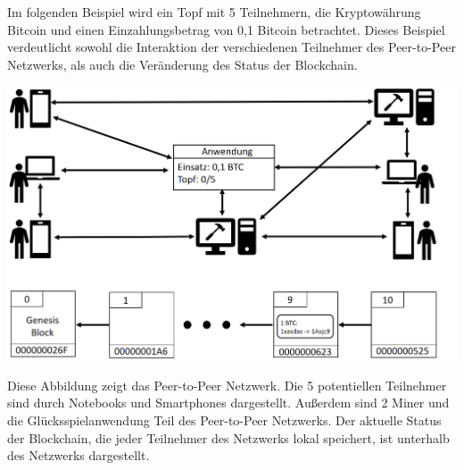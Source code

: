 \vspace{0.75cm}
\noindent Im folgenden Beispiel wird ein Topf mit 5 Teilnehmern, die Kryptowährung Bitcoin und einen Einzahlungsbetrag von 0,1 Bitcoin betrachtet. Dieses Beispiel verdeutlicht sowohl die Interaktion der verschiedenen Teilnehmer des Peer-to-Peer Netzwerks, als auch die Veränderung des Status der Blockchain.

\vspace{1cm}
\begin{minipage}{0.55\textwidth}
\includegraphics[width=\textwidth]{Figures/konzept_btc/konzept1}
\centering
\decoRule
{}
\label{fig:konzept1}
\end{minipage}
\begin{minipage}{0.45\textwidth}
Diese Abbildung zeigt das Peer-to-Peer Netzwerk. Die 5 potentiellen Teilnehmer sind durch Notebooks und Smartphones dargestellt. Außerdem sind 2 Miner und die Glücks\-spiel\-anwendung Teil des Peer-to-Peer Netzwerks. Der aktuelle Status der Blockchain, die jeder Teilnehmer des Netzwerks lokal speichert, ist unterhalb des Netzwerks dargestellt.
\end{minipage}

